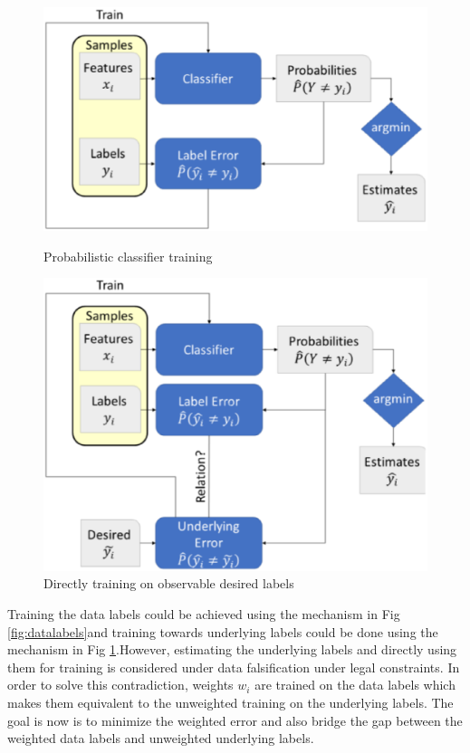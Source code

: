 \documentclass[runningheads]{llncs}
\begin{document}
\begin{figure}[H]
\begin{minipage}{.5\textwidth}
  \centering
  \includegraphics[width=\linewidth]{img/Fig1.eps}
  \caption{Probabilistic classifier training}
  \label{fig:datalabels}
\end{minipage}%
\begin{minipage}{.35\textwidth}
  \centering
  \includegraphics[width=\linewidth]{img/Fig2.eps}
  \caption{Directly training on observable desired labels}
  \label{fig:underlabels}
\end{minipage}
\end{figure}
Training the data labels could be achieved using the mechanism in Fig \ref{fig:datalabels}and training towards underlying labels could be done using the mechanism in Fig \ref{fig:underlabels}.However, estimating the underlying labels and directly using them for training is considered under data falsification under legal constraints. In order to solve this contradiction, weights $w_i$ are trained on the data labels which makes them equivalent to the unweighted training on the underlying labels. The goal is now is to minimize the weighted error and also bridge the gap between the weighted data labels and unweighted underlying labels.
\end{document}
